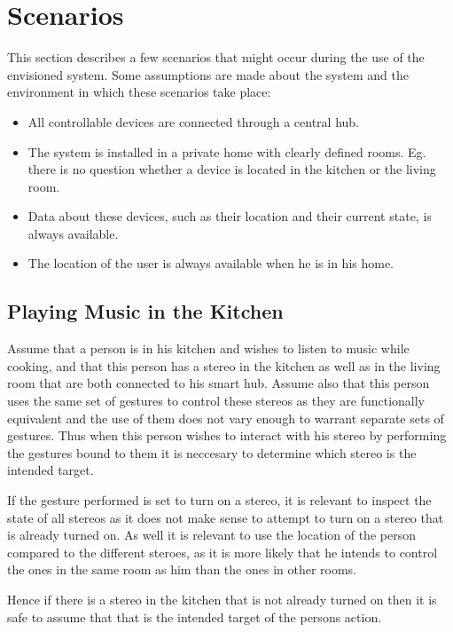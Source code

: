 \section{Scenarios}
\label{sec:analysis:scenarios}

This section describes a few scenarios that might occur during the use of the envisioned system. Some assumptions are made about the system and the environment in which these scenarios take place:

\begin{itemize}
    \item All controllable devices are connected through a central hub.
    \item The system is installed in a private home with clearly defined rooms. Eg. there is no question whether a device is located in the kitchen or the living room.
    \item Data about these devices, such as their location and their current state, is always available.
    \item The location of the user is always available when he is in his home.
\end{itemize}

\subsection{Playing Music in the Kitchen}
\label{sec:analysis:scenarios:playing_music}

Assume that a person is in his kitchen and wishes to listen to music while cooking, and that this person has a stereo in the kitchen as well as in the living room that are both connected to his smart hub.
Assume also that this person uses the same set of gestures to control these stereos as they are functionally equivalent and the use of them does not vary enough to warrant separate sets of gestures.
Thus when this person wishes to interact with his stereo by performing the gestures bound to them it is neccesary to determine which stereo is the intended target.

If the gesture performed is set to turn on a stereo, it is relevant to inspect the state of all stereos as it does not make sense to attempt to turn on a stereo that is already turned on.
As well it is relevant to use the location of the person compared to the different steroes, as it is more likely that he intends to control the ones in the same room as him than the ones in other rooms.

Hence if there is a stereo in the kitchen that is not already turned on then it is safe to  assume that that is the intended target of the persons action.

